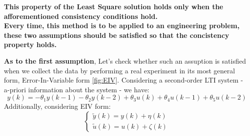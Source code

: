 \begin{QandAbox}
\textbf{This property of the Least Square solution holds only when the afforementioned consistency conditions hold.\\
Every time, this method is to be applied to an engineering problem, these two assumptions should be satisfied so that the concistency property holds.
}\end{QandAbox} \vspace{0.5cm}

\textbf{As to the first assumption}, Let's check whether such an assuption is satisfied when we collect the data by performing a real experiment in its most general form, Error-In-Variable form \ref{fig:EIV}. Considering a second-order LTI system - a-priori information about the system - we have:
\[
y(k) = -\theta_1 y(k - 1) - \theta_2 y(k - 2) + \theta_3 u(k) + \theta_4 u(k - 1) + \theta_5 u(k - 2)
\]
Additionally, considering EIV form:
\[
\begin{cases}
    \tilde{y}(k) = y(k) + \eta(k)\\
    \tilde{u}(k) = u(k) + \zeta(k)
\end{cases}
\]

